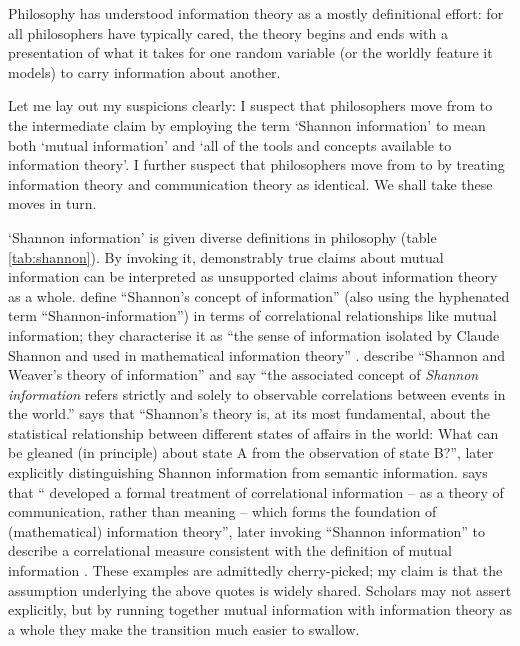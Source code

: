 \begin{myquote}
Philosophy has understood information theory as a mostly definitional effort: for all philosophers have typically cared, the theory begins and ends with a presentation of what it takes for one random variable (or the worldly feature it models) to carry information about another.
\par\hspace*{\fill}\citet[1216]{martinez2019representations}
\end{myquote}

\noindent Let me lay out my suspicions clearly: I suspect that philosophers move from \ami{} to the intermediate claim \ait{} by employing the term `Shannon information' to mean both `mutual information' and `all of the tools and concepts available to information theory'.
I further suspect that philosophers move from \ait{} to \act{} by treating information theory and communication theory as identical.
We shall take these moves in turn.

`Shannon information' is given diverse definitions in philosophy (table \ref{tab:shannon}).
By invoking it, demonstrably true claims about mutual information can be interpreted as unsupported claims about information theory as a whole.
\citet[$\S$2]{godfrey-smith2016biological} define ``Shannon's concept of information'' (also using the hyphenated term ``Shannon-information'') in terms of correlational relationships like mutual information; they characterise it as ``the sense of information isolated by Claude Shannon and used in mathematical information theory'' \citep[1]{godfrey-smith2016biological}.
\citet[759]{owren2010redefining} describe ``Shannon and Weaver's \parencite*{shannon1949mathematical} theory of information'' and say ``the associated concept of \textit{Shannon information} refers strictly and solely to observable correlations between events in the world.''
\citet[106]{dennett2017bacteria} says that ``Shannon's theory is, at its most fundamental, about the statistical relationship between different states of affairs in the world: What can be gleaned (in principle) about state A from the observation of state B?'', later explicitly distinguishing Shannon information from semantic information.
\citet[p. 12, n. 11]{shea2018representation} says that ``\citet{shannon1948mathematicalc} developed a formal treatment of correlational information -- as a theory of communication, rather than meaning -- which forms the foundation of (mathematical) information theory'', later invoking ``Shannon information'' to describe a correlational measure consistent with the definition of mutual information \citep[p. 78, n. 5]{shea2018representation}.
These examples are admittedly cherry-picked; my claim is that the assumption underlying the above quotes is widely shared.
Scholars may not assert \ait{} explicitly, but by running together mutual information with information theory as a whole they make the transition much easier to swallow.

